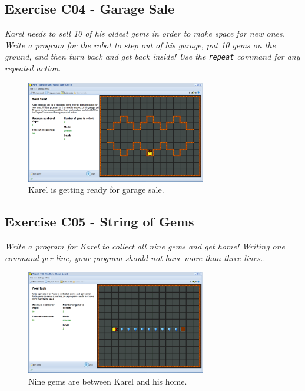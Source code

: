 \documentclass[article,A4,12pt]{llncs}
\begin{document}
\subsection{Exercise C04 - Garage Sale}

{\em Karel needs to sell 10 of his oldest gems in order to make space for new ones. 
Write a program for the robot to step out of his garage, put 10 gems on the ground, 
and then turn back and get back inside! Use the {\tt repeat} command for any repeated 
action.}

\newpage

\begin{figure}[!ht]
\begin{center}
\includegraphics[width=0.7\textwidth]{img/c04.png}
\end{center}
\vspace{-4mm}
\caption{Karel is getting ready for garage sale.}
\label{fig:c04}
\vspace{-4mm}
\end{figure}
\noindent



\subsection{Exercise C05 - String of Gems}

{\em Write a program for Karel to collect all nine gems and get home! 
Writing one command per line, your program should not have more 
than three lines.}.

\begin{figure}[!ht]
\begin{center}
\includegraphics[width=0.7\textwidth]{img/c05.png}
\end{center}
\vspace{-4mm}
\caption{Nine gems are between Karel and his home.}
\label{fig:c05}
\vspace{-4mm}
\end{figure}
\noindent
\newpage
\end{document}
